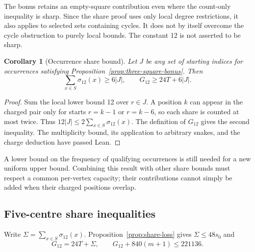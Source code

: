 \documentclass[11pt,a4paper]{article}
\newtheorem{corollary}[theorem]{Corollary}
\theoremstyle{definition}
\theoremstyle{remark}
\begin{document}
The bonus retains an empty-square contribution even where the count-only inequality is sharp. Since the share proof uses only local degree restrictions, it also applies to selected sets containing cycles. It does not by itself overcome the cycle obstruction to purely local bounds. The constant 12 is not asserted to be sharp.

\begin{corollary}[Occurrence share bound]\label{cor:occurrence-share}
Let $J$ be any set of starting indices for occurrences satisfying Proposition~\ref{prop:three-square-bonus}. Then
\[
\sum_{x\in S}\sigma_{12}(x)\ge6|J|,
\qquad G_{12}\ge24T+6|J|.
\]
\end{corollary}
\begin{proof}
Sum the local lower bound 12 over $r\in J$. A position $k$ can appear in the charged pair only for starts $r=k-1$ or $r=k-6$, so each share is counted at most twice. Thus $12|J|\le2\sum_{x\in S}\sigma_{12}(x)$. The definition of $G_{12}$ gives the second inequality. The multiplicity bound, its application to arbitrary snakes, and the charge deduction have passed Lean.
\end{proof}

A lower bound on the frequency of qualifying occurrences is still needed for a new uniform upper bound. Combining this result with other share bounds must respect a common per-vertex capacity; their contributions cannot simply be added when their charged positions overlap.

\subsection{Five-centre share inequalities}\label{sec:five-shares}
Write $\Sigma=\sum_{x\in S}\sigma_{12}(x)$. Proposition~\ref{prop:share-loss} gives $\Sigma\le48s_0$ and
\begin{equation}\label{eq:share-budget-12}
G_{12}=24T+\Sigma,\qquad G_{12}+840(m+1)\le221136.
\end{equation}
\end{document}

